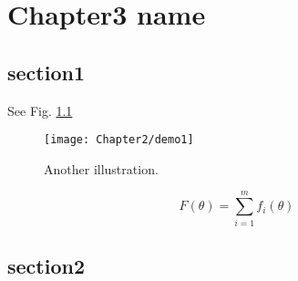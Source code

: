 
\chapter{Chapter3 name} %
\label{ch:doptim_netsys} %




\section{section1}\label{sec:top_opt_model}

 
 See Fig. \ref{fig:demo2}

\begin{figure}[!htbp]
  \centering
    \texttt{[image: Chapter2/demo1]}
  \caption{Another illustration.}
  \label{fig:demo2}
\end{figure}

\begin{equation}
F(\theta)=\sum_{i=1}^mf_i(\theta) \tag{DOP}
\end{equation}

\section{section2}\label{sec:canonical_dopt}

